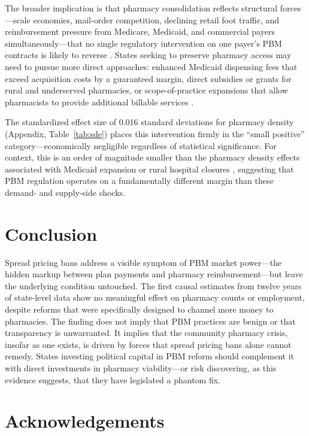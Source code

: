 \documentclass[12pt]{article}
\begin{document}
The broader implication is that pharmacy consolidation reflects structural forces---scale economies, mail-order competition, declining retail foot traffic, and reimbursement pressure from Medicare, Medicaid, and commercial payers simultaneously---that no single regulatory intervention on one payer's PBM contracts is likely to reverse \citep{schommer2020pharmacist, brown2017pharmacist}. States seeking to preserve pharmacy access may need to pursue more direct approaches: enhanced Medicaid dispensing fees that exceed acquisition costs by a guaranteed margin, direct subsidies or grants for rural and underserved pharmacies, or scope-of-practice expansions that allow pharmacists to provide additional billable services \citep{brown2017pharmacist, lookinsight2023closures}.

The standardized effect size of 0.016 standard deviations for pharmacy density (Appendix, Table~\ref{tab:sde}) places this intervention firmly in the ``small positive'' category---economically negligible regardless of statistical significance. For context, this is an order of magnitude smaller than the pharmacy density effects associated with Medicaid expansion \citep{cher2020medicaid} or rural hospital closures \citep{nikpay2019rural}, suggesting that PBM regulation operates on a fundamentally different margin than these demand- and supply-side shocks.

\section{Conclusion}

Spread pricing bans address a visible symptom of PBM market power---the hidden markup between plan payments and pharmacy reimbursement---but leave the underlying condition untouched. The first causal estimates from twelve years of state-level data show no meaningful effect on pharmacy counts or employment, despite reforms that were specifically designed to channel more money to pharmacies. The finding does not imply that PBM practices are benign or that transparency is unwarranted. It implies that the community pharmacy crisis, insofar as one exists, is driven by forces that spread pricing bans alone cannot remedy. States investing political capital in PBM reform should complement it with direct investments in pharmacy viability---or risk discovering, as this evidence suggests, that they have legislated a phantom fix.

\section*{Acknowledgements}
\end{document}
